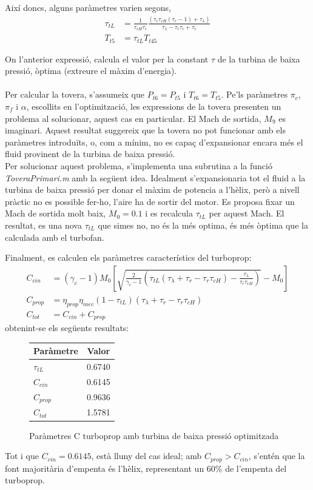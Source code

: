 \noindent Així doncs, alguns paràmetres varien segons,
\begin{align}
	\tau_{tL}&=\frac{1}{\tau_{cH}\tau_r}\frac{(\tau_r\tau_{cH}(\tau_r-1)+\tau_\lambda)}{\tau_\lambda-\tau_r\tau_{c}+\tau_r}\\
	T_{t5}&=\tau_{tL}T_{t45}
\end{align}

\noindent On l'anterior expressió, calcula el valor per la constant $\tau$ de la turbina de baixa pressió, òptima (extreure el màxim d'energia).\\
\\
Per calcular la tovera, s'assumeix que $P_{t6}=P_{t5}$ i $T_{t6}=T_{t5}$. Pe'ls paràmetres $\pi_c$, $\pi_f$ i $\alpha$, escollits en l'optimització, les expressions de la tovera presenten un problema al solucionar, aquest cas en particular. El Mach de sortida, $M_9$ es imaginari. Aquest resultat suggereix que la tovera no pot funcionar amb els paràmetres introduïts, o, com a mínim, no es capaç d'expansionar encara més el fluid provinent de la turbina de baixa pressió.\\

\noindent Per solucionar aquest problema, s'implementa una subrutina a la funció \textit{ToveraPrimari.m} amb la següent idea. Idealment s'expansionaria tot el fluid a la turbina de baixa pressió per donar el màxim de potencia a l'hèlix, però a nivell pràctic no es possible fer-ho, l'aire ha de sortir del motor. Es proposa fixar un Mach de sortida molt baix, $M_0 = 0.1$ i es recalcula $\tau_{tL}$ per aquest Mach. El resultat, es una nova $\tau_{tL}$ que simes no, no és la més optima, és més òptima que la calculada amb el turbofan.

Finalment, es calculen els paràmetres característics del turboprop:
	\begin{align}
	C_{cin} &= (\gamma_c-1)M_0\left[\sqrt{\frac{2}{\gamma_c-1}\left(\tau_{tL}(\tau_{\lambda}+\tau_r-\tau_r\tau_{cH})-\frac{\tau_{\lambda}}{\tau_r\tau_{cH}}\right)}-M_0\right] \label{turboprop_eqn1}\\
	C_{prop} &= \eta_{prop}\eta_{mec}(1-\tau_{tL})(\tau_\lambda+\tau_r-\tau_r\tau_{cH}) \label{turboprop_eqn2}\\
	C_{tot} &= C_{cin} + C_{prop} \label{turboprop_eqn3}
	\end{align}
obtenint-se els següents resultats:
\begin{figure}[H]
	\centering
	\begin{tabular}{lc}
		\toprule[3pt]
		\textbf{Paràmetre}&\textbf{Valor}\\
		\midrule[1pt]
		$\tau_{tL}$ & 0.6740\\
		$C_{cin}$ & 0.6145\\
		$C_{prop}$ & 0.9636\\
		$C_{tot}$ & 1.5781\\
		
		\bottomrule[2pt]
	\end{tabular}
\label{C_opti}
\caption{Paràmetres C turboprop amb turbina de baixa pressió optimitzada}
\end{figure}
\noindent Tot i que $C_{cin}=0.6145$, està lluny del cas ideal; amb $C_{prop}>C_{cin}$, s'entén que la font majoritària d'empenta és l'hèlix, representant un 60\% de l'empenta del turboprop.

